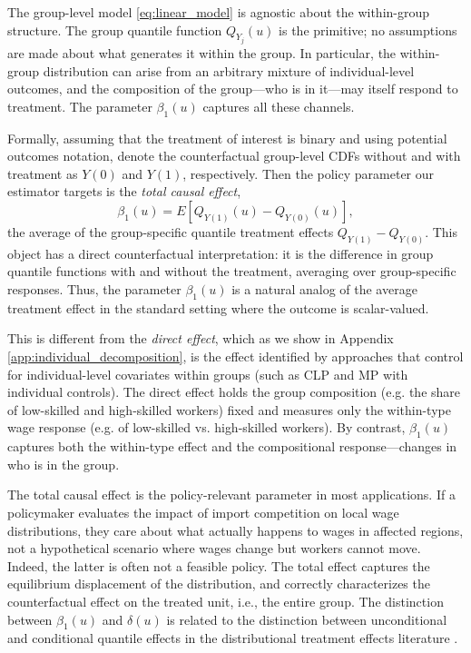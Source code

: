 \documentclass[12pt]{article}
\newcommand{\CLP}{CLP\xspace}
\newcommand{\MP}{MP\xspace}
\begin{document}
The group-level model \eqref{eq:linear_model} is agnostic about the within-group structure.  The group quantile function $Q_{Y_j}(u)$ is the primitive; no assumptions are made about what generates it within the group. In particular, the within-group distribution can arise from an arbitrary mixture of individual-level outcomes, and the composition of the group---who is in it---may itself respond to treatment. The parameter $\beta_1(u)$ captures all these channels.

Formally, assuming that the treatment of interest is binary and using potential outcomes notation, denote the counterfactual group-level CDFs without and with treatment as $Y(0)$ and $ Y(1)$, respectively. Then the policy parameter our estimator targets is the \textit{total causal effect},
\[
\beta_1(u) = E[Q_{Y(1)}(u) - Q_{Y(0)}(u)],
\]
the average of the group-specific quantile treatment effects $Q_{Y(1)} - Q_{Y(0)}$. This object has a direct counterfactual interpretation: it is the difference in group quantile functions with and without the treatment, averaging over group-specific responses. Thus, the parameter $\beta_1(u)$ is a natural analog of the average treatment effect in the standard setting where the outcome is scalar-valued.

This is different from the \emph{direct effect}, which as we show in Appendix \ref{app:individual_decomposition}, is the effect identified by approaches that control for individual-level covariates within groups (such as \CLP and \MP with individual controls). The direct effect holds the group composition (e.g. the share of low-skilled and high-skilled workers) fixed and measures only the within-type wage response (e.g. of low-skilled vs. high-skilled workers). By contrast, $\beta_1(u)$ captures both the within-type effect and the compositional response---changes in who is in the group.

The total causal effect is the policy-relevant parameter in most applications. If a policymaker evaluates the impact of import competition on local wage distributions, they care about what actually happens to wages in affected regions, not a hypothetical scenario where wages change but workers cannot move. Indeed, the latter is often not a feasible policy. The total effect captures the equilibrium displacement of the distribution, and correctly characterizes the counterfactual effect on the treated unit, i.e., the entire group. The distinction between $\beta_1(u)$ and $\delta(u)$ is related to the distinction between unconditional and conditional quantile effects in the distributional treatment effects literature \citep{firpo2009unconditional, frolich2013unconditional}. 
\end{document}
